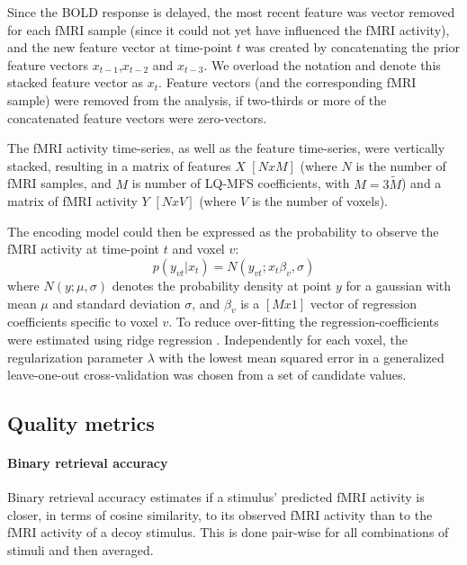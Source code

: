 Since the BOLD response is delayed,  the most recent feature was vector removed
for each f{MRI} sample (since it could not yet have influenced the f{MRI}
activity), and the new feature vector at time-point $t$ was created by
concatenating the prior feature vectors $x_{t-1}$,$x_{t-2}$ and $x_{t-3}$. We
overload the notation and denote this stacked feature vector as $x_{t}$.
Feature vectors (and the corresponding f{MRI} sample) were removed from the
analysis, if two-thirds or more of the concatenated feature vectors were
zero-vectors.

The f{MRI} activity time-series, as well as the feature time-series, were
vertically stacked, resulting in a matrix of features $X$ $[NxM]$ (where $N$ is
the number of f{MRI} samples, and $M$ is number of LQ-MFS coefficients, with
$M=3\widetilde{M}$) and a matrix of f{MRI} activity $Y$ $[NxV]$ (where $V$ is
the number of voxels).

The encoding model could then be expressed as the probability to observe the f{MRI} activity at time-point $t$ and voxel $v$:
%
\begin{equation}
  \label{eq:encmo}
  p(y_{vt}|x_{t}) = N(y_{vt};x_{t}\beta_{v},\sigma)
\end{equation}
%
where $N(y;\mu,\sigma)$ denotes the probability density at point $y$ for a
gaussian with mean $\mu$ and standard deviation $\sigma$, and $\beta_{v}$ is a
$[Mx1]$ vector of regression coefficients specific to voxel $v$. To reduce
over-fitting the regression-coefficients were estimated using ridge regression
\citep{HK70}.  Independently for each voxel, the regularization parameter
$\lambda$ with the lowest mean squared error in a generalized leave-one-out
cross-validation \citep{GHW79} was chosen from a set of candidate values.

\subsection*{Quality metrics} 

\paragraph{Binary retrieval accuracy}

Binary retrieval accuracy \citep{ML08} estimates if a stimulus'
predicted f{MRI} activity is closer, in terms of cosine similarity, to its
observed f{MRI} activity than to the f{MRI} activity of a decoy stimulus.
This is done pair-wise for all combinations of stimuli and
then averaged.

